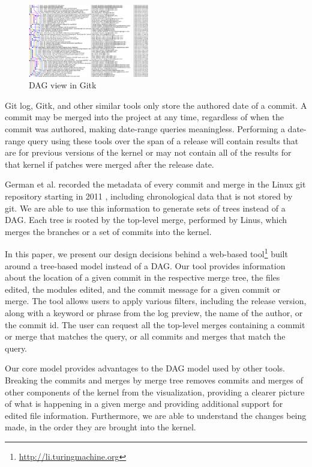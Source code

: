 \documentclass[conference, draftclsnofoot]{IEEEtran}
\begin{document}
\begin{figure}
	\centering
	\includegraphics[width=0.47\textwidth]{figures/gitk.png}
	\caption{DAG view in Gitk}
	\label{fig:gitk}
\end{figure}

Git log, Gitk, and other similar tools only store the authored date of a
commit. A commit may be merged into the project at any time, regardless of when
the commit was authored, making date-range queries meaningless. Performing a
date-range query using these tools over the span of a release will contain
results that are for previous versions of the kernel or may not contain all
of the results for that kernel if patches were merged after the release date.

German et al. recorded the metadata of every commit and merge in the Linux git
repository starting in 2011 \cite{German}, including chronological data that is
not stored by git. We are able to use this information to generate sets of
trees instead of a DAG. Each tree is rooted by the top-level merge, performed
by Linus, which merges the branches or a set of commits into the kernel.

In this paper, we present our design decisions behind a web-based
tool\footnote{\url{http://li.turingmachine.org}} built around a tree-based
model instead of a DAG. Our tool provides information about the location of a
given commit in the respective merge tree, the files edited, the modules
edited, and the commit message for a given commit or merge. The tool allows
users to apply various filters, including the release version, along with a
keyword or phrase from the log preview, the name of the author, or the commit
id. The user can request all the top-level merges containing a commit or merge
that matches the query, or all commits and merges that match the query.

Our core model provides advantages to the DAG model used by other tools.
Breaking the commits and merges by merge tree removes commits and merges of
other components of the kernel from the visualization, providing a clearer
picture of what is happening in a given merge and providing additional
support for edited file information. Furthermore, we are able to understand the
changes being made, in the order they are brought into the kernel.
\end{document}
